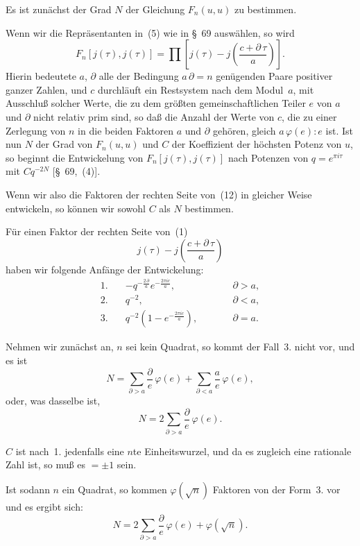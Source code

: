 \documentclass[12pt,a4paper]{article}
\theoremstyle{weber}
\begin{document}
Es ist zunächst der Grad $N$ der Gleichung $F_n(u, u)$ zu bestimmen.

Wenn wir die Repräsentanten in~(5) wie in \S~69 auswählen, so wird
\begin{equation}
F_n[j(\tau), j(\tau)] = \prod \left[j(\tau) - j\left(\frac{c + \partial\,\tau}{a}\right)\right].
\end{equation}
Hierin bedeutete $a$, $\partial$ alle der Bedingung $a\,\partial = n$ genügenden Paare positiver ganzer Zahlen, und $c$ durchläuft ein Restsystem nach dem Modul~$a$, mit Ausschluß solcher Werte, die zu dem größten gemeinschaftlichen Teiler $e$ von $a$ und $\partial$ nicht relativ prim sind, so daß die Anzahl der Werte von $c$, die zu einer Zerlegung von $n$ in die beiden Faktoren $a$ und $\partial$ gehören, gleich $a\,\varphi(e) : e$ ist. Ist nun $N$ der Grad von $F_n(u, u)$ und $C$ der Koeffizient der höchsten Potenz von $u$, so beginnt die Entwickelung von $F_n[j(\tau), j(\tau)]$ nach Potenzen von $q = e^{\pi i \tau}$ mit $Cq^{-2N}$ [\S~69,~(4)].

Wenn wir also die Faktoren der rechten Seite von~(12) in gleicher Weise entwickeln, so können wir sowohl $C$ als $N$ bestimmen.

Für einen Faktor der rechten Seite von~(1)
\[
j(\tau) - j\left(\frac{c + \partial\,\tau}{a}\right)
\]
haben wir folgende Anfänge der Entwickelung:
\begin{align*}
\text{1.}\quad & -q^{-\frac{2\,\partial}{a}} e^{-\frac{2\pi i c}{a}}, && \partial > a,\\
\text{2.}\quad & q^{-2}, && \partial < a,\\
\text{3.}\quad & q^{-2}(1 - e^{-\frac{2\pi i c}{a}}), \qquad && \partial = a.
\end{align*}

Nehmen wir zunächst an, $n$ sei kein Quadrat, so kommt der Fall~3. nicht vor, und es ist
\[
N = \sum_{\partial > a} \frac{\partial}{e}\,\varphi(e) + \sum_{\partial < a} \frac{a}{e}\,\varphi(e),
\]
oder, was dasselbe ist,
\begin{equation}
N = 2\sum_{\partial > a} \frac{\partial}{e}\,\varphi(e).
\end{equation}

$C$ ist nach~1. jedenfalls eine $n$te Einheitswurzel, und da es zugleich eine rationale Zahl ist, so muß es $= \pm 1$ sein.

Ist sodann $n$ ein Quadrat, so kommen $\varphi(\sqrt{n})$ Faktoren von der Form~3. vor und es ergibt sich:
\begin{equation}
N = 2\sum_{\partial > a} \frac{\partial}{e}\,\varphi(e) + \varphi(\sqrt{n}).
\end{equation}
\end{document}
